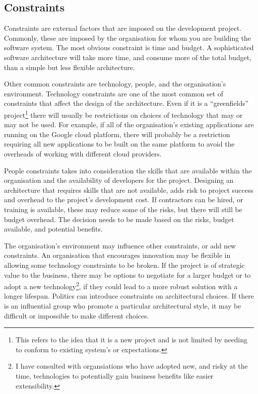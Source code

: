 \subsection{Constraints}
Constraints are external factors that are imposed on the development project.
Commonly, these are imposed by the organisation for whom you are building the software system.
The most obvious constraint is time and budget. A sophisticated software architecture will take more
time, and consume more of the total budget, than a simple but less flexible architecture.

Other common constraints are technology, people, and the organisation's environment.
Technology constraints are one of the most common set of constraints that affect the design of the architecture.
Even if it is a ``greenfields'' project\footnote{This refers to the idea that it is a new project and is not limited by
needing to conform to existing system's or expectations.}
there will usually be restrictions on choices of technology that may or may not be used.
For example, if all of the organisation's existing applications are running on the Google cloud platform,
there will probably be a restriction requiring all new applications to be built on the same platform
to avoid the overheads of working with different cloud providers.

People constraints takes into consideration the skills that are available within the organisation and the availability of developers for the project.
Designing an architecture that requires skills that are not available, adds risk to project success and overhead to the project's development cost.
If contractors can be hired, or training is available, these may reduce some of the risks, but there will still be budget overhead.
The decision needs to be made based on the risks, budget available, and potential benefits.

The organisation's environment may influence other constraints, or add new constraints.
An organisation that encourages innovation may be flexible in allowing some technology constraints to be broken.
If the project is of strategic value to the business, there may be options to negotiate for a larger budget or to adopt
a new technology\footnote{I have consulted with organsiations who have adopted new, and risky at the time,
technologies to potentially gain business benefits like easier extensibility.}, if they could lead to a more robust solution with a longer lifespan.
Politics can introduce constraints on architectural choices.
If there is an influential group who promote a particular architectural style, it may be difficult or impossible to make different choices.

